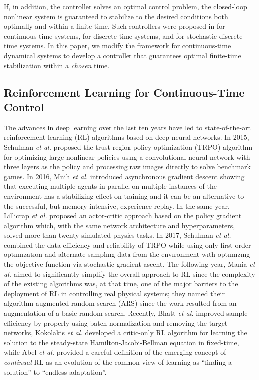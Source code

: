 If, in addition, the controller solves an optimal control problem, the closed-loop nonlinear system is guaranteed to stabilize to the desired conditions both optimally and within a finite time. Such controllers were proposed in \cite{haddad2015finite} for continuous-time systems, \cite{haddad2023finite} for discrete-time systems, and \cite{lee2023finite} for stochastic discrete-time systems. In this paper, we modify the framework for continuous-time dynamical systems \cite{haddad2015finite} to develop a controller that guarantees optimal finite-time stabilization within a \emph{chosen} time.








\subsection{Reinforcement Learning for Continuous-Time Control}          
The advances in deep learning over the last ten years have led to state-of-the-art reinforcement learning (RL) algorithms based on deep neural networks. In 2015, Schulman \emph{et al.} \cite{pmlr-v37-schulman15} proposed the trust region policy optimization (TRPO)  algorithm for optimizing large nonlinear policies using a convolutional neural network with three layers as the policy and processing raw images directly to solve benchmark games. In 2016, Mnih \emph{et al.} \cite{mnih2016asynchronous} introduced asynchronous gradient descent showing that executing multiple agents in parallel on multiple instances of the environment has a stabilizing effect on training and it can be an alternative to the successful, but memory intensive, experience replay. In the same year, Lillicrap \emph{et al.} \cite{lillicrap2019continuouscontroldeepreinforcement} proposed an actor-critic approach based on the policy gradient algorithm which, with the same network architecture and hyperparameters, solved more than twenty simulated physics tasks. In 2017, Schulman \emph{et al.} \cite{schulman2017proximal} combined the data efficiency and reliability of TRPO while using only first-order optimization and alternate sampling data from the environment with optimizing the objective function via stochastic gradient ascent. The following year, Mania \emph{et al.} \cite{NEURIPS2018_7634ea65} aimed to significantly simplify the overall approach to RL since the complexity of the existing algorithms was, at that time, one of the major barriers to the deployment of RL in controlling real physical systems; they named their algorithm augmented random search (ARS) since the work resulted from an augmentation of a basic random search. Recently, Bhatt \emph{et al.} \cite{bhattcrossq} improved sample efficiency by properly using batch normalization and removing the target networks, Kokolakis \emph{et al.} \cite{kokolakis2023fixed} developed a critic-only RL algorithm for learning the solution to the steady-state Hamilton-Jacobi-Bellman equation in fixed-time, while Abel \emph{et al.} \cite{abel2024definition} provided a careful definition of the emerging concept of \emph{continual} RL as an evolution of the common view of learning as ``finding a solution'' to ``endless adaptation''.